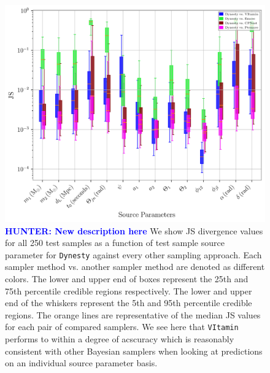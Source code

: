 \documentclass[%
showpacs,
nofootinbib,
 amsmath,amssymb,
 aps,
 twocolumn,
 prl,
 reprint,
floatfix,
]{revtex4-1}
\newcommand{\hunter}[1]{\textbf{\textcolor{blue}{HUNTER: #1}}}
\begin{document}
%
\begin{figure}
    \includegraphics[width=\textwidth]{JS_IndiPar_dynesty.png}
    \caption{\label{fig:kl_results} \hunter{New description here} We show JS divergence values for all 250 test samples as a function of test sample source parameter for \texttt{Dynesty} against every other sampling approach. Each sampler method vs. another sampler method are denoted as different colors. The lower and upper end of boxes represent the 25th and 75th percentile credible regions respectively. The lower and upper end of the whiskers represent the 5th and 95th percentile credible regions.  The orange lines are representative of the median JS values for each pair of compared samplers. We see here that \texttt{VItamin} performs to within a degree of acscuracy which is reasonably consistent with other Bayesian samplers when looking at predictions on an individual source parameter basis.
      }

\end{figure}
%
\end{document}
